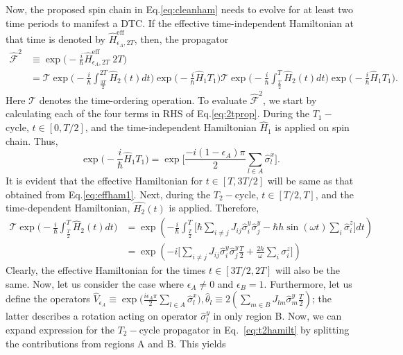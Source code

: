 \documentclass[
nofootinbib,
reprint,
superscriptaddress,
amsmath,amssymb,showkeys,
aps,
prb,
]{revtex4-2}
\begin{document}
	
	Now, the proposed spin chain in Eq.\eqref{eq:cleanham} needs to evolve for at least two time periods to manifest a DTC. If the effective time-independent Hamiltonian at that time is denoted by $\hat{H}^{\mathrm{eff}}_{\epsilon_A, 2T}$, then, the propagator
	\begin{align}
		\hat{\mathcal{F}}^{2} &\equiv \exp\Big(-\frac{i}{\hbar}\hat{H}_{\epsilon_A, 2T}^{\mathrm{eff}}\;2T\Big) \label{eq:heff}\\ 
		&= \mathcal{T}\exp\Big(-\frac{i}{\hbar}\int_{\frac{3T}{2}}^{2T}\hat{H}_2(t) dt\Big)
		\exp\Big(-\frac{i}{\hbar}\hat{H}_1T_1\Big)\mathcal{T}\exp\Big(-\frac{i}{\hbar}\int_{\frac{T}{2}}^{T}\hat{H}_2(t) dt\Big)\exp\Big(-\frac{i}{\hbar}\hat{H}_1T_1\Big).
		\label{eq:2tprop}
	\end{align}
	Here $\mathcal{T}$ denotes the time-ordering operation. 
	To evaluate $\hat{\mathcal{F}}^2$, we start by calculating each of the four terms in RHS of Eq.\ref{eq:2tprop}. During the $T_1-$cycle, $t\in[0,T/2]$, and the time-independent Hamiltonian $\hat{H}_1$ is applied on spin chain. Thus,
	\begin{equation}
		\exp\Big(-\frac{i}{\hbar} \hat{H}_1 T_1\Big) = 	\exp\Bigg[\frac{-i(1-\epsilon_A)\pi}{2}\sum_{l \in A}\hat{\sigma}^x_l\Bigg].
		\label{eq:effham1}
	\end{equation}	
	It is evident that the effective Hamiltonian for $t \in[T, 3T/2]$ will be same as that obtained from Eq.\eqref{eq:effham1}. Next, during the $T_2-$cycle, $t\in[T/2,T]$, and the time-dependent Hamiltonian, $\hat{H_2}(t)$ is applied. Therefore,
	\begin{align}
		\mathcal{T}\exp\Big(-\frac{i}{\hbar}\int_{\frac{T}{2}}^{T}\hat{H}_2(t) dt\Big) &= \exp( -\frac{i}{\hbar}\int_{\frac{T}{2}}^{T}\Big[\hbar\sum_{i\neq j}J_{ij}\hat{\sigma}^y_i\hat{\sigma}^y_j-\hbar h\sin(\omega t)\sum_i\hat{\sigma}^z_i\Big] dt)\nonumber\\
		&= \exp(-i \Big[\sum_{i\neq j}J_{ij}\hat{\sigma}^y_i\hat{\sigma}^y_j \frac{T}{2} + \frac{2h}{\omega}\sum_i \sigma^z_i\Big])
		\label{eq:t2hamilt}
	\end{align}
	Clearly, the effective Hamiltonian for the times  $t \in[3T/2, 2T]$ will also be the same. Now,	let us consider the case where $\epsilon_A \neq 0$ and $\epsilon_B=1$. Furthermore, let us define the operators $\displaystyle \hat{V}_{\epsilon_A} \equiv \exp\Big(\frac{i\epsilon_A \pi}{2}\sum_{l\in A}\hat{\sigma}^x_l\Big), \displaystyle \hat{\theta}_l \equiv 2 \left(\sum_{m \in B}J_{lm}\hat{\sigma}^y_m \frac{T}{2} \right)$; the latter describes a rotation acting on operator $\hat{\sigma}^y_l$ in only region B.  Now, we can expand expression for the  $T_2-$cycle propagator in Eq.~\ref{eq:t2hamilt} by splitting the contributions from regions A and B. This yields
\end{document}
